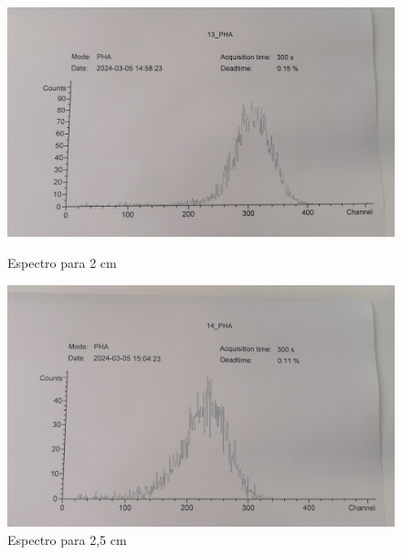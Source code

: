 \documentclass[a4paper,12pt,spanish]{article}
\begin{document}
\begin{figure}[H]
	 	\begin{minipage}{0.45\textwidth}
	 		\centering
	 		\includegraphics[width=1.1\textwidth]{"graficas recortadas/13"} %
	 		\caption*{Espectro para 2 cm}
	 	\end{minipage}\hfill
	 	\begin{minipage}{0.45\textwidth}
	 		\centering
	 		\includegraphics[width=1.1\textwidth]{"graficas recortadas/14"} %
	 		\caption*{Espectro para 2,5 cm}
	 	\end{minipage}
 	

\end{figure}
\end{document}
